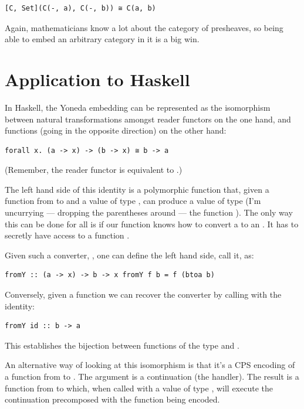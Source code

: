 \begin{verbatim}
[C, Set](C(-, a), C(-, b)) ≅ C(a, b)
\end{verbatim}

Again, mathematicians know a lot about the category of presheaves, so
being able to embed an arbitrary category in it is a big win.

\section{Application to Haskell}\label{application-to-haskell}

In Haskell, the Yoneda embedding can be represented as the isomorphism
between natural transformations amongst reader functors on the one hand,
and functions (going in the opposite direction) on the other hand:

\begin{verbatim}
forall x. (a -> x) -> (b -> x) ≅ b -> a
\end{verbatim}

(Remember, the reader functor is equivalent to
.)

The left hand side of this identity is a polymorphic function that,
given a function from  to  and a value of type
, can produce a value of type  (I'm uncurrying ---
dropping the parentheses around --- the function
). The only way this can be done for all
 is if our function knows how to convert a  to an
. It has to secretly have access to a function
.

Given such a converter, , one can define the left hand
side, call it, as:

\begin{verbatim}
fromY :: (a -> x) -> b -> x fromY f b = f (btoa b)
\end{verbatim}

Conversely, given a function  we can recover the converter
by calling  with the identity:

\begin{verbatim}
fromY id :: b -> a
\end{verbatim}

This establishes the bijection between functions of the type
 and .

An alternative way of looking at this isomorphism is that it's a CPS
encoding of a function from  to . The argument
 is a continuation (the handler). The result
is a function from  to  which, when called with a
value of type , will execute the continuation precomposed with
the function being encoded.

